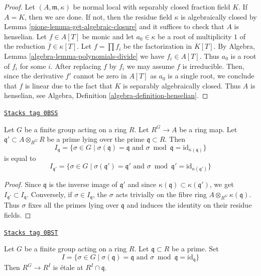 \begin{proof}

Let $(A, \mathfrak m, \kappa)$ be normal local with separably
closed fraction field $K$. If $A = K$, then we are done. If not,
then the residue field $\kappa$ is algebraically closed
by Lemma \ref{pione-lemma-get-algebraic-closure} and it suffices to
check that $A$ is henselian.
Let $f \in A[T]$ be monic and let $a_0 \in \kappa$ be a root
of multiplicity $1$ of the reduction $\overline{f} \in \kappa[T]$.
Let $f = \prod f_i$ be the factorization in $K[T]$.
By Algebra, Lemma \ref{algebra-lemma-polynomials-divide} we have
$f_i \in A[T]$. Thus $a_0$ is a root of $f_i$ for some $i$.
After replacing $f$ by $f_i$ we may assume $f$ is irreducible.
Then, since the derivative $f'$ cannot be zero in $A[T]$
as $a_0$ is a single root, we conclude that $f$ is linear
due to the fact that $K$ is separably algebraically closed.
Thus $A$ is henselian, see
Algebra, Definition \ref{algebra-definition-henselian}.
\end{proof}

\begin{lemma}
\label{pione-lemma-inertia-base-change}
\href{https://stacks.math.columbia.edu/tag/0BSS}{\texttt{Stacks tag 0BSS}}

Let $G$ be a finite group acting on a ring $R$. Let $R^G \to A$ be a ring
map. Let $\mathfrak q' \subset A \otimes_{R^G} R$ be a prime lying
over the prime $\mathfrak q \subset R$. Then
$$
I_\mathfrak q = \{\sigma \in G \mid
\sigma(\mathfrak q) = \mathfrak q\text{ and }
\sigma \bmod \mathfrak q = \text{id}_{\kappa(\mathfrak q)}\}
$$
is equal to
$$
I_{\mathfrak q'} = \{\sigma \in G \mid
\sigma(\mathfrak q') = \mathfrak q'\text{ and }
\sigma \bmod \mathfrak q' = \text{id}_{\kappa(\mathfrak q')}\}
$$
\end{lemma}

\begin{proof}
Since $\mathfrak q$ is the inverse image of $\mathfrak q'$
and since $\kappa(\mathfrak q) \subset \kappa(\mathfrak q')$,
we get $I_{\mathfrak q'} \subset I_\mathfrak q$.
Conversely, if $\sigma \in I_\mathfrak q$, the $\sigma$
acts trivially on the fibre ring $A \otimes_{R^G} \kappa(\mathfrak q)$.
Thus $\sigma$ fixes all the primes lying over $\mathfrak q$
and induces the identity on their residue fields.
\end{proof}

\begin{lemma}
\label{pione-lemma-inertia-invariants-etale}
\href{https://stacks.math.columbia.edu/tag/0BST}{\texttt{Stacks tag 0BST}}

Let $G$ be a finite group acting on a ring $R$. Let $\mathfrak q \subset R$
be a prime. Set
$$
I = \{\sigma \in G \mid \sigma(\mathfrak q) = \mathfrak q
\text{ and } \sigma \bmod \mathfrak q = \text{id}_\mathfrak q\}
$$
Then $R^G \to R^I$ is \'etale at $R^I \cap \mathfrak q$.
\end{lemma}

